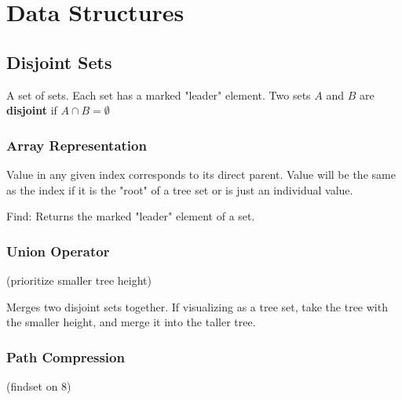\section{Data Structures}
\subsection*{Disjoint Sets}
A set of sets. Each set has a marked "leader" element.
{\footnotesize Two sets $A$ and $B$ are \textbf{disjoint} if $A\cap B=\emptyset$}

\subsubsection*{Array Representation}
Value in any given index corresponds to its direct parent.
Value will be the same as the index if it is the "root" of a tree set or is just an individual value.

Find: Returns the marked "leader" element of a set.

\subsubsection*{Union Operator}
(prioritize smaller tree height)

Merges two disjoint sets together.
If visualizing as a tree set,
take the tree with the smaller height,
and merge it into the taller tree.


\subsubsection*{Path Compression}
(findset on 8)


